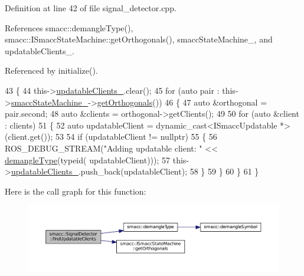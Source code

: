 Definition at line 42 of file signal\+\_\+detector.\+cpp.



References smacc\+::demangle\+Type(), smacc\+::\+I\+Smacc\+State\+Machine\+::get\+Orthogonals(), smacc\+State\+Machine\+\_\+, and updatable\+Clients\+\_\+.



Referenced by initialize().


\begin{DoxyCode}
43 \{
44     this->\hyperlink{classsmacc_1_1SignalDetector_a36a702afabbc335cbdb1e8699b669323}{updatableClients\_}.clear();
45     \textcolor{keywordflow}{for} (\textcolor{keyword}{auto} pair : this->\hyperlink{classsmacc_1_1SignalDetector_a46025de6ac7b5980e22144f9703236a4}{smaccStateMachine\_}->\hyperlink{classsmacc_1_1ISmaccStateMachine_a262b3f2d15af019190fa69b7c0df00f8}{getOrthogonals}())
46     \{
47         \textcolor{keyword}{auto} &orthogonal = pair.second;
48         \textcolor{keyword}{auto} &clients = orthogonal->getClients();
49 
50         \textcolor{keywordflow}{for} (\textcolor{keyword}{auto} &client : clients)
51         \{
52             \textcolor{keyword}{auto} updatableClient = \textcolor{keyword}{dynamic\_cast<}ISmaccUpdatable *\textcolor{keyword}{>}(client.get());
53 
54             \textcolor{keywordflow}{if} (updatableClient != \textcolor{keyword}{nullptr})
55             \{
56                 ROS\_DEBUG\_STREAM(\textcolor{stringliteral}{"Adding updatable client: "} << \hyperlink{namespacesmacc_a792e7a3ea0843e87543a465b446ae730}{demangleType}(\textcolor{keyword}{typeid}(
      updatableClient)));
57                 this->\hyperlink{classsmacc_1_1SignalDetector_a36a702afabbc335cbdb1e8699b669323}{updatableClients\_}.push\_back(updatableClient);
58             \}
59         \}
60     \}
61 \}
\end{DoxyCode}


Here is the call graph for this function\+:
\nopagebreak
\begin{figure}[H]
\begin{center}
\leavevmode
\includegraphics[width=350pt]{classsmacc_1_1SignalDetector_a47ec2df560e2e33758ce3975bece9385_cgraph}
\end{center}
\end{figure}




